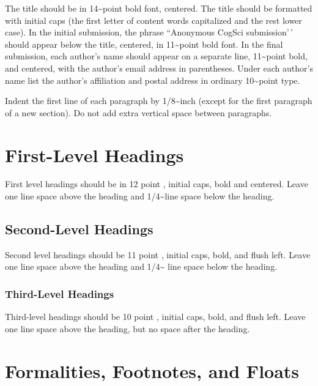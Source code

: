 \documentclass[10pt, letterpaper]{article}
\begin{document}
The title should be in 14\textasciitilde point bold font, centered. The
title should be formatted with initial caps (the first letter of content
words capitalized and the rest lower case). In the initial submission,
the phrase ``Anonymous CogSci submission'\,' should appear below the
title, centered, in 11\textasciitilde point bold font. In the final
submission, each author's name should appear on a separate line,
11\textasciitilde point bold, and centered, with the author's email
address in parentheses. Under each author's name list the author's
affiliation and postal address in ordinary 10\textasciitilde point type.

Indent the first line of each paragraph by 1/8\textasciitilde inch
(except for the first paragraph of a new section). Do not add extra
vertical space between paragraphs.

\hypertarget{first-level-headings}{%
\section{First-Level Headings}\label{first-level-headings}}

First level headings should be in 12 point , initial caps, bold and
centered. Leave one line space above the heading and
1/4\textasciitilde line space below the heading.

\hypertarget{second-level-headings}{%
\subsection{Second-Level Headings}\label{second-level-headings}}

Second level headings should be 11 point , initial caps, bold, and flush
left. Leave one line space above the heading and 1/4\textasciitilde{}
line space below the heading.

\hypertarget{third-level-headings}{%
\subsubsection{Third-Level Headings}\label{third-level-headings}}

Third-level headings should be 10 point , initial caps, bold, and flush
left. Leave one line space above the heading, but no space after the
heading.

\hypertarget{formalities-footnotes-and-floats}{%
\section{Formalities, Footnotes, and
Floats}\label{formalities-footnotes-and-floats}}
\end{document}
